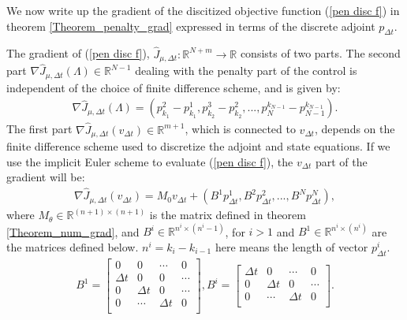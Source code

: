 We now write up the gradient of the discitized objective function (\ref{pen disc f}) in theorem \ref{Theorem_penalty_grad} expressed in terms of the discrete adjoint $p_{\Delta t}$.
\begin{theorem} \label{Theorem_penalty_grad}
The gradient of (\ref{pen disc f}), $\hat J_{\mu,\Delta t}:\mathbb{R}^{N+m}\rightarrow\mathbb{R}$ consists of two parts. The second part $ \nabla\hat J_{\mu,\Delta t}(\Lambda)\in\mathbb{R}^{N-1}$ dealing with the penalty part of the control is independent of the choice of finite difference scheme, and is given by:
\begin{align}
\nabla\hat J_{\mu,\Delta t}(\Lambda) = (p_{k_1}^{2}-p_{k_1}^{1},p_{k_2}^{3}-p_{k_2}^{2},...,p_{N}^{k_{N-1}}-p_{N-1}^{k_{N-1}}). \label{num_pen_grad_lam}
\end{align} 
The first part $ \nabla\hat J_{\mu,\Delta t}(v_{\Delta t})\in\mathbb{R}^{m+1}$, which is connected to $v_{\Delta t}$, depends on the finite difference scheme used to discretize the adjoint and state equations. If we use the implicit Euler scheme to evaluate (\ref{pen disc f}), the $v_{\Delta t}$ part of the gradient will be:
\begin{align}
\nabla\hat J_{\mu,\Delta t}(v_{\Delta t})= M_{0}v_{\Delta t} + (B^1p_{\Delta t}^1,B^2p_{\Delta t}^2,...,B^Np_{\Delta t}^N), \label{num_pen_grad_v}
\end{align}
where $M_{\theta}\in \mathbb{R}^{(n+1)\times (n+1)}$ is the matrix defined in theorem \ref{Theorem_num_grad}, and $B^i\in \mathbb{R}^{n^i\times (n^i-1)}$, for $i>1$ and $B^1\in \mathbb{R}^{n^i\times (n^i)}$ are the matrices defined below. $n^i=k_i-k_{i-1}$ here means the length of vector $p_{\Delta t}^i$.
\begin{align*}
B^1 = \left[ \begin{array}{cccc}
   0& 0 & \cdots & 0 \\  
   \Delta t& 0 & 0 & \cdots \\ 
   0 & \Delta t& 0  & \cdots \\
   0 &\cdots & \Delta t& 0   \\
   \end{array}  \right]
,B^i = \left[ \begin{array}{cccc}  
   \Delta t& 0 & \cdots & 0 \\ 
   0 & \Delta t& 0  & \cdots \\
   0 &\cdots & \Delta t& 0   \\
   \end{array}  \right] .
\end{align*}

\end{theorem}
